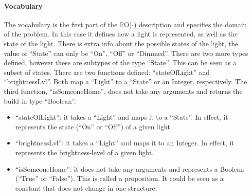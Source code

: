 \documentclass[11pt,a4paper]{report}
\newcommand{\fodot}{FO($\cdot$)\xspace}
\begin{document}
\paragraph{Vocabulary}
The vocabulary is the first part of the \fodot description and specifies the domain of the problem. In this case it defines how a light is represented, as well as the state of the light. There is extra info about the possible states of the light, the value of ``State'' can only be ``On'', ``Off'' or ``Dimmed''. There are two more types defined, however these are subtypes of the type ``State''. This can be seen as a subset of states. There are two functions defined: ``stateOfLight'' and ``brightnessLvl''. Both map a ``Light'' to a ``State'' or an Integer, respectively. The third function, ``isSomeoneHome'', does not take any arguments and returns the build in type ``Boolean''.
\begin{itemize}
    \item ``stateOfLight'': it takes a ``Light'' and maps it to a ``State''. In effect, it represents the state (``On'' or ``Off'') of a given light.
    \item ``brightnessLvl'': it takes a ``Light'' and maps it to an Integer. In effect, it represents the brightness-level of a given light.
    \item ``isSomeoneHome'': it does not take any arguments and represents a Boolean (``True'' or ``False''). This is called a proposition. It could be seen as a constant that does not change in one structure.
\end{itemize}
\end{document}
